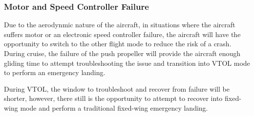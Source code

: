 \subsubsection{Motor and Speed Controller Failure}

Due to the aerodynmic nature of the aircraft, in situations where the aircraft suffers motor or an electronic speed controller failure, the aircraft will have the opportunity to switch to the other flight mode to reduce the risk of a crash. During cruise, the failure of the push propeller will provide the aircraft enough gliding time to attempt troubleshooting the issue and transition into VTOL mode to perform an emergency landing.

During VTOL, the window to troubleshoot and recover from failure will be shorter, however, there still is the opportunity to attempt to recover into fixed-wing mode and perform a traditional fixed-wing emergency landing.
